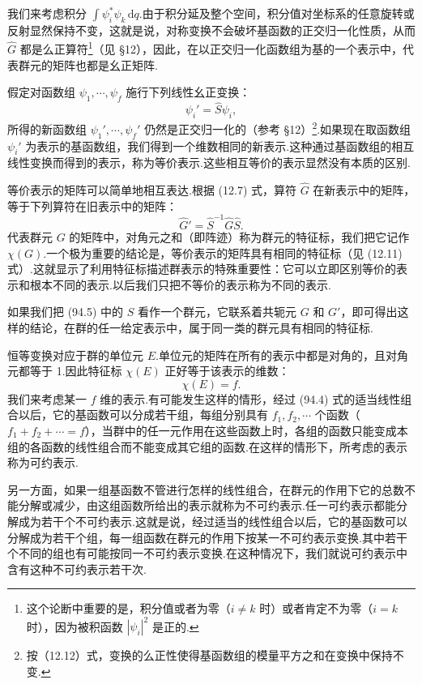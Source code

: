 我们来考虑积分 $\int\psi_i^{*}\psi_k\,\mathrm{d}q$.由于积分延及整个空间，积分值对坐标系的任意旋转或反射显然保持不变，这就是说，对称变换不会破坏基函数的正交归一化性质，从而 $\hat{G}$ 都是么正算符\footnote{这个论断中重要的是，积分值或者为零（$i\neq k$ 时）或者肯定不为零（$i=k$ 时），因为被积函数 $|\psi_i|^2$ 是正的.}（见 §12），因此，在以正交归一化函数组为基的一个表示中，代表群元的矩阵也都是幺正矩阵.

假定对函数组 $\psi_1,\cdots,\psi_f$ 施行下列线性幺正变换：
\begin{equation}
  \psi_i'=\hat{S}\psi_i,
\end{equation}
所得的新函数组 $\psi_1',\cdots,\psi_f'$ 仍然是正交归一化的（参考 §12）\footnote{按（12.12）式，变换的么正性使得基函数组的模量平方之和在变换中保持不变.}.如果现在取函数组 $\psi_i'$ 为表示的基函数组，我们得到一个维数相同的新表示.这种通过基函数组的相互线性变换而得到的表示，称为等价表示.这些相互等价的表示显然没有本质的区别.

等价表示的矩阵可以简单地相互表达.根据 (12.7) 式，算符 $\hat{G}$ 在新表示中的矩阵，等于下列算符在旧表示中的矩阵：
\begin{equation}
  \hat{G}'=\hat{S}^{-1}\hat{G}\hat{S}.
\end{equation}
代表群元 $G$ 的矩阵中，对角元之和（即阵迹）称为群元的特征标，我们把它记作 $\chi(G)$.一个极为重要的结论是，等价表示的矩阵具有相同的特征标（见 (12.11) 式）.这就显示了利用特征标描述群表示的特殊重要性：它可以立即区别等价的表示和根本不同的表示.以后我们只把不等价的表示称为不同的表示.

如果我们把 (94.5) 中的 $S$ 看作一个群元，它联系着共轭元 $G$ 和 $G'$，即可得出这样的结论，在群的任一给定表示中，属于同一类的群元具有相同的特征标.

恒等变换对应于群的单位元 $E$.单位元的矩阵在所有的表示中都是对角的，且对角元都等于 1.因此特征标 $\chi(E)$ 正好等于该表示的维数：
\begin{equation}
  \chi(E)=f.
\end{equation}
我们来考虑某一 $f$ 维的表示.有可能发生这样的情形，经过 (94.4) 式的适当线性组合以后，它的基函数可以分成若干组，每组分别具有 $f_1,f_2,\cdots$ 个函数（$f_1+f_2+\cdots=f$），当群中的任一元作用在这些函数上时，各组的函数只能变成本组的各函数的线性组合而不能变成其它组的函数.在这样的情形下，所考虑的表示称为可约表示.

另一方面，如果一组基函数不管进行怎样的线性组合，在群元的作用下它的总数不能分解或减少，由这组函数所给出的表示就称为不可约表示.任一可约表示都能分解成为若干个不可约表示.这就是说，经过适当的线性组合以后，它的基函数可以分解成为若干个组，每一组函数在群元的作用下按某一不可约表示变换.其中若干个不同的组也有可能按同一不可约表示变换.在这种情况下，我们就说可约表示中含有这种不可约表示若干次.

